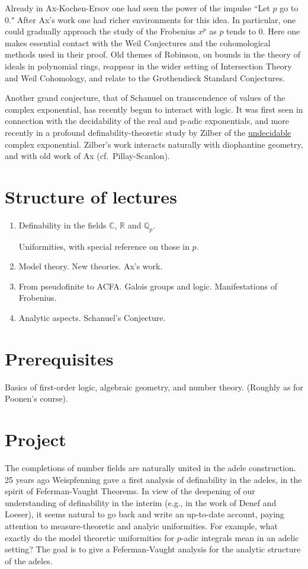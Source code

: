 \documentclass{article}
\begin{document}
Already in Ax-Kochen-Ersov one had seen the power of the 
impulse ``Let $p$ go to 0."  After Ax's work one had richer environments 
for
this idea. In particular, one could gradually approach the 
study
of the Frobenius $x^p$ as $p$ tends to 0. Here one makes 
essential
contact with the Weil Conjectures and the cohomological 
methods
used in their proof. Old themes of Robinson, on bounds in the
theory of ideals in polynomial rings, reappear in the wider
setting of Intersection Theory and Weil Cohomology, and 
relate to
the Grothendieck Standard Conjectures.


Another grand conjecture, that of Schanuel on transcendence 
of
values of the complex exponential, has recently begun to 
interact
with logic. It was first seen in connection with the 
decidability
of the real and p-adic exponentials, and more recently in a
profound definability-theoretic study by Zilber of the
\underline{undecidable} complex exponential. Zilber's work
interacts naturally with diophantine geometry, and with old 
work of
Ax (cf.~Pillay-Scanlon).
 

\section{Structure of lectures}

\begin{enumerate}

\item

Definability
in the fields ${\mathbb C}$, ${\mathbb R}$ and ${\mathbb Q}_{p}$.

Uniformities, with special
reference on those in $p$.
\item
Model theory.
 New theories. Ax's work.
\item
From pseudofinite to ACFA. Galois groups and logic. Manifestations of
Frobenius. 
\item
Analytic aspects. Schanuel's Conjecture.
\end{enumerate}

\section{Prerequisites}
Basics of first-order logic, algebraic geometry, and number
theory. (Roughly as for Poonen's course).

\section{Project}
The completions of number fields are naturally united in
the adele construction. 25 years ago Weispfenning gave a first analysis
of definability in the adeles, in the spirit of Feferman-Vaught
Theorems. In view of the deepening of our understanding of definability
in the interim (e.g., in the work of Denef and Loeser),  it seems natural to
go back and write an up-to-date account, paying attention to
measure-theoretic and analyic uniformities. For example, what exactly do
the model theoretic uniformities for $p$-adic integrals mean in an adelic
setting? The goal is to give a Feferman-Vaught analysis for the analytic
structure of the adeles.
\end{document}
